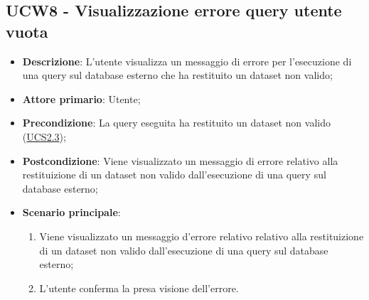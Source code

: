 \subsection{UCW8 - Visualizzazione errore query utente vuota}
\label{sub:ucw8}
\begin{itemize}
    \item \textbf{Descrizione}: L'utente visualizza un messaggio di errore per l'esecuzione di una query sul database 
    esterno che ha restituito un dataset non valido;

    \item \textbf{Attore primario}: Utente;
    
    \item \textbf{Precondizione}:   La query eseguita ha restituito un dataset non valido 
    (\hyperref[ssub:ucs2.3]{UCS2.3});

    \item \textbf{Postcondizione}:   Viene visualizzato un messaggio di errore relativo alla restituizione di un dataset non valido dall'esecuzione di una query sul database esterno;
    
    \item \textbf{Scenario principale}:
    \begin{enumerate}
        \item Viene visualizzato un messaggio d'errore relativo relativo alla restituizione di un dataset non valido 
        dall'esecuzione di una query sul database esterno;
        \item L'utente conferma la presa visione dell'errore.
    \end{enumerate}

\end{itemize}